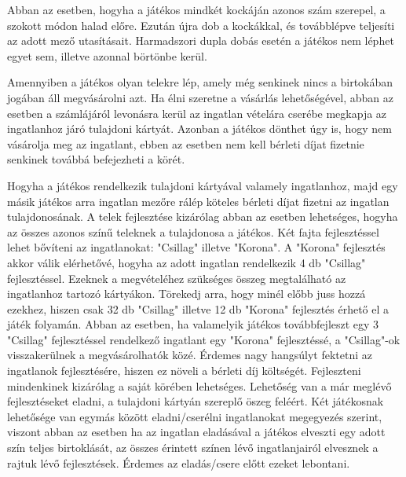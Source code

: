 
Abban az esetben, hogyha a játékos mindkét kockáján azonos szám szerepel, a szokott módon halad előre. Ezután újra dob a kockákkal, és továbblépve teljesíti az adott mező utasításait. Harmadszori dupla dobás esetén a játékos nem léphet egyet sem, illetve azonnal börtönbe kerül.


Amennyiben a játékos olyan telekre lép, amely még senkinek nincs a birtokában jogában áll megvásárolni azt. Ha élni szeretne a vásárlás lehetőségével, abban az esetben a számlájáról levonásra kerül az ingatlan vételára cserébe megkapja az ingatlanhoz járó tulajdoni kártyát. Azonban a játékos dönthet úgy is, hogy nem vásárolja meg az ingatlant, ebben az esetben nem kell bérleti díjat fizetnie senkinek továbbá befejezheti a körét.


Hogyha a játékos rendelkezik tulajdoni kártyával valamely ingatlanhoz, majd egy másik játékos arra ingatlan mezőre rálép köteles bérleti díjat fizetni az ingatlan tulajdonosának.
A telek fejlesztése kizárólag abban az esetben lehetséges, hogyha az összes azonos színű teleknek a tulajdonosa a játékos.
Két fajta fejlesztéssel lehet bővíteni az ingatlanokat: "Csillag" illetve "Korona". A "Korona" fejlesztés akkor válik elérhetővé, hogyha az adott ingatlan rendelkezik 4 db "Csillag" fejlesztéssel. Ezeknek a megvételéhez szükséges összeg megtalálható az ingatlanhoz tartozó kártyákon. Törekedj arra, hogy minél előbb juss hozzá ezekhez, hiszen csak 32 db "Csillag" illetve 12 db "Korona" fejlesztés érhető el a játék folyamán. Abban az esetben, ha valamelyik játékos továbbfejleszt egy 3 "Csillag" fejlesztéssel rendelkező ingatlant egy "Korona" fejlesztéssé, a "Csillag"-ok visszakerülnek a megvásárolhatók közé.
Érdemes nagy hangsúlyt fektetni az ingatlanok fejlesztésére, hiszen ez növeli a bérleti díj költségét.
Fejleszteni mindenkinek kizárólag a saját körében lehetséges.
Lehetőség van a már meglévő fejlesztéseket eladni, a tulajdoni kártyán szereplő öszeg feléért.
Két játékosnak lehetősége van egymás között eladni/cserélni ingatlanokat megegyezés szerint, viszont abban az esetben ha az ingatlan eladásával a játékos elveszti egy adott szín teljes birtoklását, az összes érintett színen lévő ingatlanjairól elvesznek a rajtuk lévő fejlesztések. Érdemes az eladás/csere előtt ezeket lebontani.




